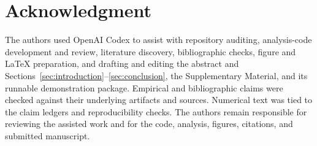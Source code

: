 \section*{Acknowledgment}

The authors used OpenAI Codex to assist with repository auditing, analysis-code
development and review, literature discovery, bibliographic checks, figure
and LaTeX preparation, and drafting and editing the abstract and
Sections~\ref{sec:introduction}--\ref{sec:conclusion}, the Supplementary Material,
and its runnable demonstration package. Empirical and
bibliographic claims were checked against their underlying artifacts and
sources. Numerical text was tied to the claim ledgers and reproducibility
checks. The authors remain responsible for reviewing the assisted work and
for the code, analysis, figures, citations, and submitted manuscript.
